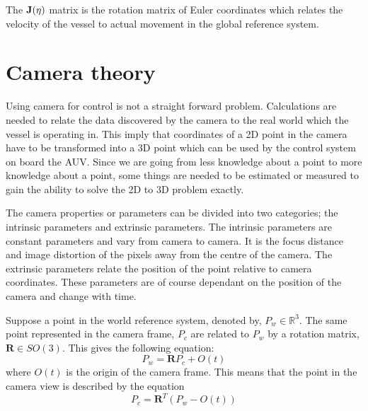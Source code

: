 	The $\mathbf{J}(\mathbf{\eta})$ matrix is the rotation matrix of Euler coordinates which relates the velocity of the 
	vessel to actual movement in the global reference system.




\section{Camera theory}
	\label{ch1-cameramodel}
	Using camera for control is not a straight forward problem. Calculations are needed to relate the data
discovered 
	by the camera to the real world which the vessel is operating in. This imply that coordinates of a 2D
point in 
	the camera have to be transformed into a 3D point which can be used by the control system on board the
AUV. Since 
	we are going from less knowledge about a point to more knowledge about a point, some things are needed to be 
	estimated or measured to gain the ability to solve the 2D to 3D problem exactly.
	
	The camera properties or parameters can be divided into two categories; the intrinsic parameters and
extrinsic 
	parameters. The intrinsic parameters are constant parameters and vary from camera to camera. It is the focus 
	distance and image distortion of the pixels away from the centre of the camera. The extrinsic
parameters relate 
	the position of the point relative to camera coordinates. These parameters are of course dependant on
the 
	position of the camera and change with time. \cite{robotbok}
	
	
	Suppose a point in the world reference system, denoted by, $P_w \in \mathbb{R}^3$. The same point
	represented in the camera frame, $P_c$ are related to $P_w$ by a rotation matrix, $\mathbf{R} \in
	SO(3)$. This gives the following equation: 
	\begin{equation}
		P_w = \mathbf{R} P_c + O(t)
	\end{equation}
	where $O(t)$ is the origin of the camera frame. This means that the point in the camera view is
	described by the equation
	\begin{equation}
		\label{eq:ch1-P_c}
		P_c = \mathbf{R}^T (P_w - O(t))
	\end{equation}

